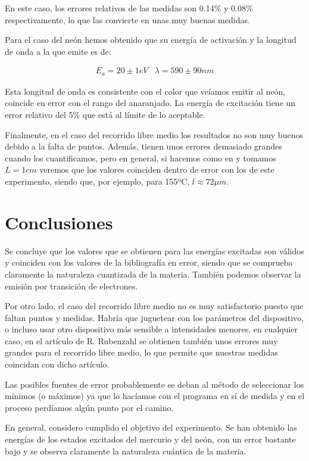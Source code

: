 \documentclass{article}
\begin{document}
En este caso, los errores relativos de las medidas son 0.14\% y 0.08\% respectivamente, lo que las convierte en unas muy buenas medidas.

Para el caso del neón hemos obtenido que su energía de activación y la longitud de onda a la que emite es de:

$$
\begin{array}{cc}
E_a = 20 \pm 1 eV & \lambda = 590 \pm 90 nm
\end{array}
$$

Esta longitud de onda es consistente con el color que veíamos emitir al neón, coincide en error con el rango del anaranjado. La energía de excitación tiene un error relativo del 5\% que está al límite de lo aceptable.

Finalmente, en el caso del recorrido libre medio los resultados no son muy buenos debido a la falta de puntos. Además, tienen unos errores demasiado grandes cuando los cuantificamos, pero en general, si hacemos como en \cite{Rubenza} y tomamos $L = 1cm$ veremos que los valores coinciden dentro de error con los de este experimento, siendo que, por ejemplo, para 155ºC, $l \approx 72 \mu m$.

\section{Conclusiones}

Se concluye que los valores que se obtienen para las energías excitadas son válidos y coinciden con los valores de la bibliografía en error, siendo que se comprueba claramente la naturaleza cuantizada de la materia. También podemos observar la emisión por transición de electrones.

Por otro lado, el caso del recorrido libre medio no es muy satisfactorio puesto que faltan puntos y medidas. Habría que juguetear con los parámetros del dispositivo, o incluso usar otro dispositivo más sensible a intensidades menores, en cualquier caso, en el artículo de R. Rubenzahl \cite{Rubenza} se obtienen también unos errores muy grandes para el recorrido libre medio, lo que permite que nuestras medidas coincidan con dicho artículo.

Las posibles fuentes de error probablemente se deban al método de seleccionar los mínimos (o máximos) ya que lo hacíamos con el programa en sí de medida y en el proceso perdíamos algún punto por el camino.

En general, considero cumplido el objetivo del experimento. Se han obtenido las energías de los estados excitados del mercurio y del neón, con un error bastante bajo y se observa claramente la naturaleza cuántica de la materia.
\end{document}
